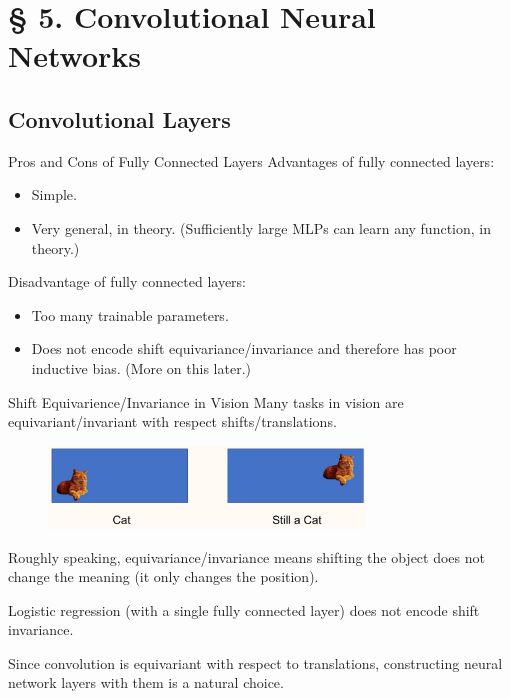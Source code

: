 \section{§ 5. Convolutional Neural Networks}

\subsection{Convolutional Layers}

\begin{frame}[allowframebreaks]

\begin{myconceptblock}{5.1}{Pros and Cons of Fully Connected Layers}
    Advantages of fully connected layers:

    \begin{itemize}
        \item Simple.
        \item Very general, in theory. (Sufficiently large MLPs can learn any function, in theory.)
    \end{itemize}

    Disadvantage of fully connected layers:

    \begin{itemize}
        \item Too many trainable parameters.
        \item Does not encode shift equivariance/invariance and therefore has poor inductive bias. (More on this later.)
    \end{itemize}
\end{myconceptblock}

\end{frame}

\begin{frame}[allowframebreaks]

\begin{myconceptblock}{5.2}{Shift Equivarience/Invariance in Vision}
    Many tasks in vision are equivariant/invariant with respect shifts/translations.

    \begin{figure}[H]
        \centering
        \includegraphics[width=0.75\textwidth]{.././assets/5.1.png}
    \end{figure}

    Roughly speaking, equivariance/invariance means shifting the object does not change the meaning (it only changes the position).

    Logistic regression (with a single fully connected layer) does not encode shift invariance.

    Since convolution is equivariant with respect to translations, constructing neural network layers with them is a natural choice.
\end{myconceptblock}

\end{frame}

